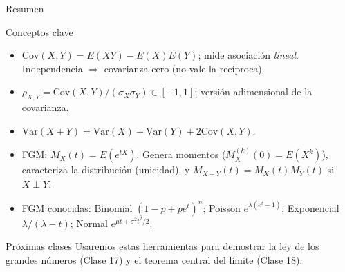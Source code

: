 \documentclass[aspectratio=169,11pt]{beamer}
\begin{document}
\begin{frame}{Resumen}
\begin{block}{Conceptos clave}
\begin{itemize}
\item $\text{Cov}(X,Y) = E(XY)-E(X)E(Y)$; mide asociación \emph{lineal}. Independencia $\Rightarrow$ covarianza cero (no vale la recíproca).
\item $\rho_{X,Y} = \text{Cov}(X,Y)/(\sigma_X\sigma_Y) \in [-1,1]$: versión adimensional de la covarianza.
\item $\text{Var}(X+Y) = \text{Var}(X)+\text{Var}(Y)+2\text{Cov}(X,Y)$.
\item FGM: $M_X(t) = E(e^{tX})$. Genera momentos ($M_X^{(k)}(0) = E(X^k)$), caracteriza la distribución (unicidad), y $M_{X+Y}(t)=M_X(t)M_Y(t)$ si $X\perp Y$.
\item FGM conocidas: Binomial $(1-p+pe^t)^n$; Poisson $e^{\lambda(e^t-1)}$; Exponencial $\lambda/(\lambda-t)$; Normal $e^{\mu t+\sigma^2t^2/2}$.
\end{itemize}
\end{block}

\begin{alertblock}{Próximas clases}
Usaremos estas herramientas para demostrar la ley de los grandes números (Clase 17) y el teorema central del límite (Clase 18).
\end{alertblock}
\end{frame}
\end{document}
